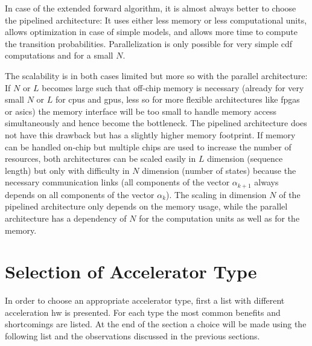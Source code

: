 \documentclass[mscthesis]{usiinfthesis}
\begin{document}
In case of the extended forward algorithm, it is almost always better to choose
the pipelined architecture: It uses either less memory or less computational
units, allows optimization in case of simple models, and allows more time to
compute the transition probabilities. Parallelization is only possible for very
simple \gls{cdf} computations and for a small $N$.

The scalability is in both cases limited but more so with the parallel
architecture: If $N$ or $L$ becomes large such that off-chip memory is
necessary (already for very small $N$ or $L$ for \glspl{cpu} and \glspl{gpu},
less so for more flexible architectures like \glspl{fpga} or \glspl{asic}) the
memory interface will be too small to handle memory access simultaneously and
hence become the bottleneck. The pipelined architecture does not have this
drawback but has a slightly higher memory footprint. If memory can be handled
on-chip but multiple chips are used to increase the number of resources, both
architectures can be scaled easily in $L$ dimension (sequence length) but only
with difficulty in $N$ dimension (number of states) because the necessary
communication links (all components of the vector $\alpha_{k+1}$ always depends
on all components of the vector $\alpha_k$). The scaling in dimension $N$ of
the pipelined architecture only depends on the memory usage, while the parallel
architecture has a dependency of $N$ for the computation units as well as for
the memory.

\section{Selection of Accelerator Type}
\label{ch:analysis_choice}

In order to choose an appropriate accelerator type, first a list with different
acceleration \gls{hw} is presented. For each type the most common benefits and
shortcomings are listed. At the end of the section a choice will be made using
the following list and the observations discussed in the previous sections.
\end{document}
